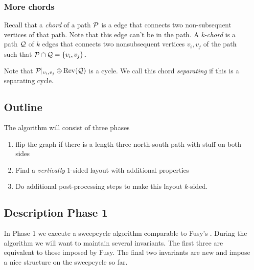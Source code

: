 
  \subsubsection{More chords}
    Recall that a \emph{chord} of a path $\P$ is a edge that connects two non-subsequent vertices of that path. Note that this edge can't be in the path. A \emph{k-chord} is a path $\Q$ of $k$ edges that connects two nonsubsequent vertices $v_i, v_j$ of the path such that $\P \cap \Q = \braces{v_i, v_j}$.

    Note that $\P|_{v_i, v_j} \oplus \rev(\Q)$ is a cycle. We call this chord \emph{separating} if this is a separating cycle. 


\subsection{Outline}
  The algorithm will consist of three phases

  \begin{enumerate}
    \item flip the graph if there is a length three north-south path with stuff on both sides
    \item Find a \emph{vertically} 1-sided layout with additional properties
    \item Do additional post-processing steps to make this layout $k$-sided.
  \end{enumerate}

\subsection{Description Phase 1}
  In Phase 1 we execute a sweepcycle algorithm comparable to Fusy's \cite{Fusy2006}.
  During the algorithm we will want to maintain several invariants. The first three are equivalent to those imposed by Fusy. The final two invariants are new and impose a nice structure on the sweepcycle so far.

